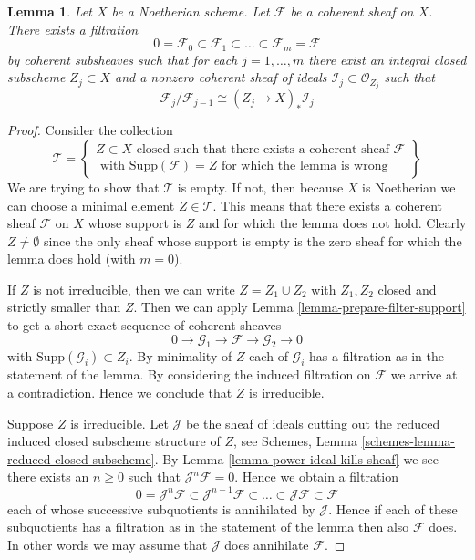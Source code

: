 \documentclass{stacks-project}
\theoremstyle{plain}
\newtheorem{lemma}[subsection]{Lemma}
\theoremstyle{definition}
\theoremstyle{remark}
\numberwithin{equation}{subsection}
\begin{document}
\begin{lemma}
\label{lemma-coherent-filter}
Let $X$ be a Noetherian scheme.
Let $\mathcal{F}$ be a coherent sheaf on $X$.
There exists a filtration
$$
0 = \mathcal{F}_0 \subset \mathcal{F}_1 \subset
\ldots \subset \mathcal{F}_m = \mathcal{F}
$$
by coherent subsheaves such that for each $j = 1, \ldots, m$
there exist an integral closed subscheme $Z_j \subset X$ and
a nonzero coherent sheaf of ideals $\mathcal{I}_j \subset \mathcal{O}_{Z_j}$
such that
$$
\mathcal{F}_j/\mathcal{F}_{j - 1}
\cong (Z_j \to X)_* \mathcal{I}_j
$$
\end{lemma}

\begin{proof}
Consider the collection
$$
\mathcal{T} =
\left\{
\begin{matrix}
Z \subset X
\text{ closed such that there exists a coherent sheaf }
\mathcal{F} \\
\text{ with }
\text{Supp}(\mathcal{F}) = Z
\text{ for which the lemma is wrong}
\end{matrix}
\right\}
$$
We are trying to show that $\mathcal{T}$ is empty. If not, then
because $X$ is Noetherian we can choose a minimal element
$Z \in \mathcal{T}$. This means that there exists a coherent
sheaf $\mathcal{F}$ on $X$ whose support is $Z$ and for which the
lemma does not hold. Clearly $Z \not = \emptyset$ since the only
sheaf whose support is empty is the zero sheaf for which the
lemma does hold (with $m = 0$).

\medskip\noindent
If $Z$ is not irreducible, then we can write $Z = Z_1 \cup Z_2$
with $Z_1, Z_2$ closed and strictly smaller than $Z$.
Then we can apply Lemma \ref{lemma-prepare-filter-support}
to get a short exact sequence of coherent sheaves
$$
0 \to
\mathcal{G}_1 \to
\mathcal{F} \to
\mathcal{G}_2 \to 0
$$
with $\text{Supp}(\mathcal{G}_i) \subset Z_i$. By minimality of
$Z$ each of $\mathcal{G}_i$ has a filtration as in the statement
of the lemma. By considering the induced filtration on $\mathcal{F}$
we arrive at a contradiction. Hence we conclude
that $Z$ is irreducible.

\medskip\noindent
Suppose $Z$ is irreducible. Let $\mathcal{J}$ be the sheaf of ideals
cutting out the reduced induced closed subscheme structure of $Z$,
see Schemes, Lemma \ref{schemes-lemma-reduced-closed-subscheme}.
By Lemma \ref{lemma-power-ideal-kills-sheaf} we see there exists
an $n \geq 0$ such that $\mathcal{J}^n\mathcal{F} = 0$. Hence we obtain
a filtration
$$
0 = \mathcal{J}^n\mathcal{F} \subset \mathcal{J}^{n - 1}\mathcal{F}
\subset \ldots \subset \mathcal{J}\mathcal{F} \subset \mathcal{F}
$$
each of whose successive subquotients is annihilated by $\mathcal{J}$.
Hence if each of these subquotients has a filtration as in the statement
of the lemma then also $\mathcal{F}$ does. In other words we may
assume that $\mathcal{J}$ does annihilate $\mathcal{F}$.


\end{proof}
\end{document}

